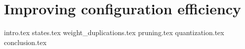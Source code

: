 \chapter{Improving configuration efficiency}
{intro.tex}
{states.tex}
{weight_duplications.tex}
{pruning.tex}
{quantization.tex}
{conclusion.tex}